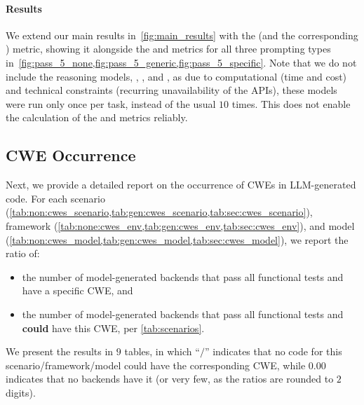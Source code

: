 \paragraph{Results}
We extend our main results in~\cref{fig:main_results} with the  (and the corresponding ) metric, showing it alongside the  and  metrics for all three prompting types in~\cref{fig:pass_5_none,fig:pass_5_generic,fig:pass_5_specific}.
Note that we do not include the reasoning models, \openaiothree{}, \openaione{}, and \dsro{}, as due to computational (time and cost) and technical constraints (recurring unavailability of the APIs), these models were run only once per task, instead of the usual $10$ times. 
This does not enable the calculation of the  and  metrics reliably.

\subsection{CWE Occurrence} 
\label{appendix:cwe_ocurence}

Next, we provide a detailed report on the occurrence of CWEs in LLM-generated code.
For each scenario (\cref{tab:non:cwes_scenario,tab:gen:cwes_scenario,tab:sec:cwes_scenario}), framework (\cref{tab:none:cwes_env,tab:gen:cwes_env,tab:sec:cwes_env}), and model (\cref{tab:non:cwes_model,tab:gen:cwes_model,tab:sec:cwes_model}), we report the ratio of:
\begin{itemize}
    \item the number of model-generated backends that pass all functional tests and have a specific CWE, and 
    \item the number of model-generated backends that pass all functional tests and \textbf{could} have this CWE, per \cref{tab:scenarios}.
\end{itemize}
We present the results in $9$ tables, in which ``$/$'' indicates that no code for this scenario/framework/model could have the corresponding CWE, while $0.00$ indicates that no backends have it (or very few, as the ratios are rounded to $2$ digits). 











\clearpage
